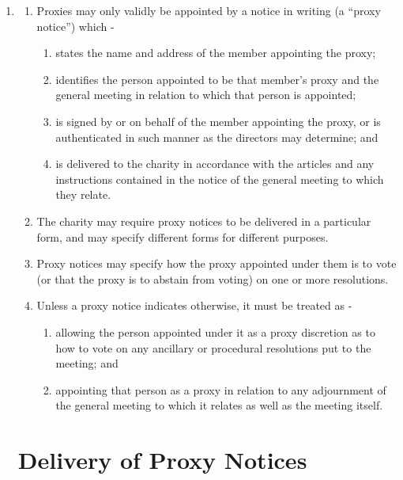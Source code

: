 \begin{enumerate}
\item \label{proxies}
  \begin{enumerate}
  \item
    Proxies may only validly be appointed by a notice in writing (a
    ``proxy notice'') which -
    \begin{enumerate}
    \item
      states the name and address of the member appointing the proxy;
    \item
      identifies the person appointed to be that member's proxy and the
      general meeting in relation to which that person is appointed;
    \item
      is signed by or on behalf of the member appointing the proxy, or is
      authenticated in such manner as the directors may determine; and
    \item
      is delivered to the charity in accordance with the articles and any
      instructions contained in the notice of the general meeting to
      which they relate.
    \end{enumerate}
  \item
    The charity may require proxy notices to be delivered in a
    particular form, and may specify different forms for different
    purposes.
  \item
    Proxy notices may specify how the proxy appointed under them is to
    vote (or that the proxy is to abstain from voting) on one or more
    resolutions.
  \item
    Unless a proxy notice indicates otherwise, it must be treated as -
    \begin{enumerate}
    \item
      allowing the person appointed under it as a proxy discretion as to
      how to vote on any ancillary or procedural resolutions put to the
      meeting; and
    \item
      appointing that person as a proxy in relation to any adjournment of
      the general meeting to which it relates as well as the meeting
      itself.
    \end{enumerate}
  \end{enumerate}

\section{Delivery of Proxy Notices}


\end{enumerate}
